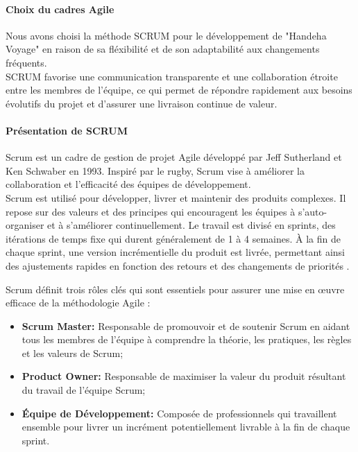 \documentclass[12pt]{report}
\makeatletter
\renewcommand\subparagraph{\@startsection{subparagraph}{5}{\z@}{3.25ex \@plus1ex \@minus.2ex}{1ex \@plus.2ex}{\normalfont\normalsize\bfseries}} \renewcommand\thesubparagraph{$-$} \makeatother
\makeatother
\begin{document}
				\paragraph{Choix du cadres Agile}
	
				Nous avons choisi la méthode SCRUM pour le développement de "Handeha Voyage" en raison de sa fléxibilité et de son adaptabilité aux changements fréquents.\\

				SCRUM favorise une communication transparente et une collaboration étroite entre les membres de l'équipe, ce qui permet de répondre rapidement aux besoins évolutifs du projet et d'assurer une livraison continue de valeur.

				\paragraph{Présentation de SCRUM}

				Scrum est un cadre de gestion de projet Agile développé par Jeff Sutherland et Ken Schwaber en 1993. Inspiré par le rugby, Scrum vise à améliorer la collaboration et l'efficacité des équipes de développement.\\
				
				Scrum est utilisé pour développer, livrer et maintenir des produits complexes. Il repose sur des valeurs et des principes qui encouragent les équipes à s'auto-organiser et à s'améliorer continuellement. Le travail est divisé en sprints, des itérations de temps fixe qui durent généralement de 1 à 4 semaines. À la fin de chaque sprint, une version incrémentielle du produit est livrée, permettant ainsi des ajustements rapides en fonction des retours et des changements de priorités \cite{ScrumGuide}.

				\subparagraph{Rôles dans Scrum}

				Scrum définit trois rôles clés qui sont essentiels pour assurer une mise en œuvre efficace de la méthodologie Agile :

				\begin{itemize}
					\item \textbf{Scrum Master:} Responsable de promouvoir et de soutenir Scrum en aidant tous les membres de l'équipe à comprendre la théorie, les pratiques, les règles et les valeurs de Scrum;
					\item \textbf{Product Owner:} Responsable de maximiser la valeur du produit résultant du travail de l'équipe Scrum;
					\item \textbf{Équipe de Développement:} Composée de professionnels qui travaillent ensemble pour livrer un incrément potentiellement livrable à la fin de chaque sprint.
				\end{itemize}
\end{document}
